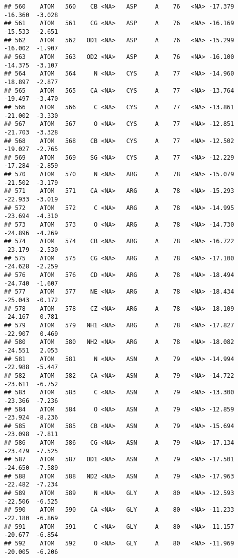 \documentclass[
]{article}
\begin{document}
\begin{verbatim}
## 560    ATOM   560    CB <NA>   ASP     A    76   <NA> -17.379 -16.360  -3.028
## 561    ATOM   561    CG <NA>   ASP     A    76   <NA> -16.169 -15.533  -2.651
## 562    ATOM   562   OD1 <NA>   ASP     A    76   <NA> -15.299 -16.002  -1.907
## 563    ATOM   563   OD2 <NA>   ASP     A    76   <NA> -16.100 -14.375  -3.107
## 564    ATOM   564     N <NA>   CYS     A    77   <NA> -14.960 -18.897  -2.877
## 565    ATOM   565    CA <NA>   CYS     A    77   <NA> -13.764 -19.497  -3.470
## 566    ATOM   566     C <NA>   CYS     A    77   <NA> -13.861 -21.002  -3.330
## 567    ATOM   567     O <NA>   CYS     A    77   <NA> -12.851 -21.703  -3.328
## 568    ATOM   568    CB <NA>   CYS     A    77   <NA> -12.502 -19.027  -2.765
## 569    ATOM   569    SG <NA>   CYS     A    77   <NA> -12.229 -17.284  -2.859
## 570    ATOM   570     N <NA>   ARG     A    78   <NA> -15.079 -21.502  -3.179
## 571    ATOM   571    CA <NA>   ARG     A    78   <NA> -15.293 -22.933  -3.019
## 572    ATOM   572     C <NA>   ARG     A    78   <NA> -14.995 -23.694  -4.310
## 573    ATOM   573     O <NA>   ARG     A    78   <NA> -14.730 -24.896  -4.269
## 574    ATOM   574    CB <NA>   ARG     A    78   <NA> -16.722 -23.179  -2.530
## 575    ATOM   575    CG <NA>   ARG     A    78   <NA> -17.100 -24.628  -2.259
## 576    ATOM   576    CD <NA>   ARG     A    78   <NA> -18.494 -24.740  -1.607
## 577    ATOM   577    NE <NA>   ARG     A    78   <NA> -18.434 -25.043  -0.172
## 578    ATOM   578    CZ <NA>   ARG     A    78   <NA> -18.109 -24.167   0.781
## 579    ATOM   579   NH1 <NA>   ARG     A    78   <NA> -17.827 -22.907   0.469
## 580    ATOM   580   NH2 <NA>   ARG     A    78   <NA> -18.082 -24.551   2.053
## 581    ATOM   581     N <NA>   ASN     A    79   <NA> -14.994 -22.988  -5.447
## 582    ATOM   582    CA <NA>   ASN     A    79   <NA> -14.722 -23.611  -6.752
## 583    ATOM   583     C <NA>   ASN     A    79   <NA> -13.300 -23.366  -7.236
## 584    ATOM   584     O <NA>   ASN     A    79   <NA> -12.859 -23.924  -8.236
## 585    ATOM   585    CB <NA>   ASN     A    79   <NA> -15.694 -23.098  -7.811
## 586    ATOM   586    CG <NA>   ASN     A    79   <NA> -17.134 -23.479  -7.525
## 587    ATOM   587   OD1 <NA>   ASN     A    79   <NA> -17.501 -24.650  -7.589
## 588    ATOM   588   ND2 <NA>   ASN     A    79   <NA> -17.963 -22.482  -7.234
## 589    ATOM   589     N <NA>   GLY     A    80   <NA> -12.593 -22.506  -6.525
## 590    ATOM   590    CA <NA>   GLY     A    80   <NA> -11.233 -22.180  -6.869
## 591    ATOM   591     C <NA>   GLY     A    80   <NA> -11.157 -20.677  -6.854
## 592    ATOM   592     O <NA>   GLY     A    80   <NA> -11.969 -20.005  -6.206

\end{verbatim}
\end{document}

